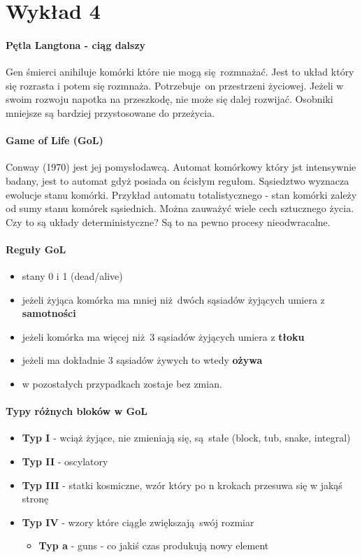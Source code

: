 \documentclass{article}
\begin{document}
		\section{Wykład 4}
			\paragraph{Pętla Langtona - ciąg dalszy} Gen śmierci anihiluje komórki które nie mogą się rozmnażać. Jest to układ który się rozrasta i potem się rozmnaża. Potrzebuje on przestrzeni życiowej. Jeżeli w swoim rozwoju napotka na przeszkodę, nie może się dalej rozwijać. Osobniki mniejsze są bardziej przystosowane do przeżycia. 
			\paragraph{Game of Life (GoL)} Conway (1970) jest jej pomysłodawcą. Automat komórkowy który jst intensywnie badany, jest to automat gdyż posiada on ścisłym regułom. Sąsiedztwo wyznacza ewolucje stanu komórki. Przykład automatu totalistycznego - stan komórki zależy od sumy stanu komórek sąsiednich. Można zauważyć wiele cech sztucznego życia. Czy to są układy deterministyczne? Są to na pewno procesy nieodwracalne. 
			\paragraph{Reguły GoL}
			\begin{itemize}
				\item stany 0 i 1 (dead/alive)
				\item jeżeli żyjąca komórka ma mniej niż dwóch sąsiadów żyjących umiera z \textbf{samotności}
				\item jeżeli komórka ma więcej niż 3 sąsiadów żyjących umiera z \textbf{tłoku}
				\item jeżeli ma dokładnie 3 sąsiadów żywych to wtedy \textbf{ożywa}
				\item w pozostałych przypadkach zostaje bez zmian.
			\end{itemize}
			\paragraph{Typy różnych bloków w GoL}
			\begin{itemize}
				\item \textbf{Typ I} - wciąż żyjące, nie zmieniają się, są stałe (block, tub, snake, integral)
				\item \textbf{Typ II} - oscylatory 
				\item \textbf{Typ III} - statki kosmiczne, wzór który po n krokach przesuwa się w jakąś stronę
				\item \textbf{Typ IV} - wzory które ciągle zwiększają swój rozmiar
				\begin{itemize}
					\item \textbf{Typ a} - guns - co jakiś czas produkują nowy element
				\end{itemize} 
			\end{itemize}
		 
\end{document}
